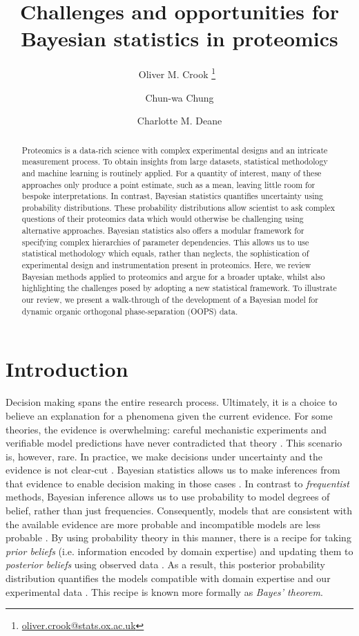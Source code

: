 \documentclass[12pt,english]{article}
\title{Challenges and opportunities for Bayesian statistics in proteomics}
\author[1]{Oliver M. Crook \thanks{\url{oliver.crook@stats.ox.ac.uk}}~}
\author[2]{Chun-wa Chung}
\author[1]{Charlotte M. Deane}
\affil[1]{Department of Statistics, University of Oxford, Oxford, UK}
\affil[2]{Structural and Biophysical Sciences, GlaxoSmithKline R\&D, Stevenage, UK}
\begin{document}
\maketitle
\begin{abstract}
Proteomics is a data-rich science with complex experimental designs and an intricate measurement process. To obtain insights from large datasets, statistical methodology and machine learning is routinely applied. For a quantity of interest, many of these approaches only produce a point estimate, such as a mean, leaving little room for bespoke interpretations. In contrast, Bayesian statistics quantifies uncertainty using probability distributions. These probability distributions allow scientist to ask complex questions of their proteomics data which would otherwise be challenging using alternative approaches. Bayesian statistics also offers a modular framework for specifying complex hierarchies of parameter dependencies. This allows us to use statistical methodology which equals, rather than neglects, the sophistication of experimental design and instrumentation present in proteomics. Here, we review Bayesian methods applied to proteomics and argue for a broader uptake, whilst also highlighting the challenges posed by adopting a new statistical framework. To illustrate our review, we present a walk-through of the development of a Bayesian model for dynamic organic orthogonal phase-separation (OOPS) data.      
\end{abstract}
\section{Introduction}
Decision making spans the entire research process. Ultimately, it is a choice to believe an explanation for a phenomena given the current evidence. For some theories, the evidence is overwhelming: careful mechanistic experiments and verifiable model predictions have never contradicted that theory \citep{Wilkie::1974}. This scenario is, however, rare. In practice, we make decisions under uncertainty and the evidence is not clear-cut \citep{Tversky::1974}. Bayesian statistics allows us to make inferences from that evidence to enable decision making in those cases \citep{Gelman::1995}. In contrast to \textit{frequentist} methods, Bayesian inference allows us to use probability to model degrees of belief, rather than just frequencies. Consequently, models that are consistent with the available evidence are more probable and incompatible models are less probable \citep{Gelman::2020, Schad::2021}. By using probability theory in this manner, there is a recipe for taking \textit{prior beliefs} (i.e. information encoded by domain expertise) and updating them to \textit{posterior beliefs} using observed data \citep{Gelman::1995}. As a result, this posterior probability distribution quantifies the models compatible with domain expertise and our experimental data \citep{Gelman::2020}. This recipe is known more formally as \textit{Bayes' theorem}. 
\end{document}
